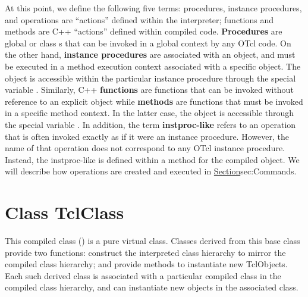 \documentclass{article}
\begin{document}
At this point, we define the following five terms:
procedures, instance procedures, and operations are ``actions'' defined
within the interpreter; functions and methods are C++ ``actions''
defined within compiled code.
\textbf{Procedures} are global or class s
that can be invoked in a global context by any OTcl code.
On the other hand, \textbf{instance procedures} are associated with an
object, and must be executed in a method execution context associated
with a specific object.  The object is accessible within
the particular instance procedure through the special variable
.
Similarly,
C++ \textbf{functions} are functions that can be invoked without 
reference to an explicit object while \textbf{methods}
are functions that must be invoked in a specific method context.
In the latter case, the object is accessible through the
special variable .
In addition, the term \textbf{instproc-like} refers to
an operation that is often invoked
exactly as if it were an instance procedure.
However, the name of that operation
does not correspond to any OTcl instance procedure.
Instead, the instproc-like is defined within
a  method for the compiled object.
We will describe how operations are created and executed in
\href{the following sections}{Section}{sec:Commands}.


\section{Class TclClass}
\label{sec:TclClass}

This compiled class ()
is a pure virtual class.
Classes derived from this base class provide two functions:
construct the interpreted class hierarchy
to mirror the compiled class hierarchy; and
provide methods to instantiate new TclObjects.
Each such derived class is associated with a particular compiled class
in the compiled class hierarchy, and can instantiate new objects in the
associated class.
\end{document}
